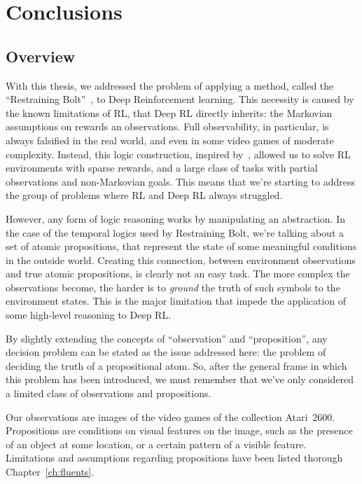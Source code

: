 \chapter{Conclusions}

\label{ch:conclusions}

\section{Overview}

With this thesis, we addressed the problem of applying a method, called the
``Restraining Bolt''~\cite{bib:bolt}, to Deep Reinforcement learning. This
necessity is caused by the known limitations of RL, that Deep RL directly
inherits: the Markovian assumptions on rewards an observations. Full
observability, in particular, is always falsified in the real world, and even
in some video games of moderate complexity. Instead, this logic construction,
inspired by~\cite{bib:nmrdp-logic-first}, allowed us to solve RL environments
with sparse rewards, and a large class of tasks with partial observations and
non-Markovian goals. This means that we're starting to address the group of
problems where RL and Deep RL always struggled.

However, any form of logic reasoning works by manipulating an abstraction. In
the case of the temporal logics used by Restraining Bolt, we're talking about
a set of atomic propositions, that represent the state of some meaningful
conditions in the outside world. Creating this connection, between environment
observations and true atomic propositions, is clearly not an easy task. The
more complex the observations become, the harder is to \emph{ground} the truth
of such symbols to the environment states. This is the major limitation that
impede the application of some high-level reasoning to Deep RL.

By slightly extending the concepts of ``observation'' and ``proposition'',
any decision problem can be stated as the issue addressed here: the problem of
deciding the truth of a propositional atom. So, after the general frame in
which this problem has been introduced, we must remember that we've only
considered a limited class of observations and propositions.

Our observations are images of the video games of the collection Atari~2600.
Propositions are conditions on visual features on the image, such as the
presence of an object at some location, or a certain pattern of a visible
feature. Limitations and assumptions regarding propositions have been listed
thorough Chapter~\ref{ch:fluents}.
\enlargethispage{1\baselineskip}



